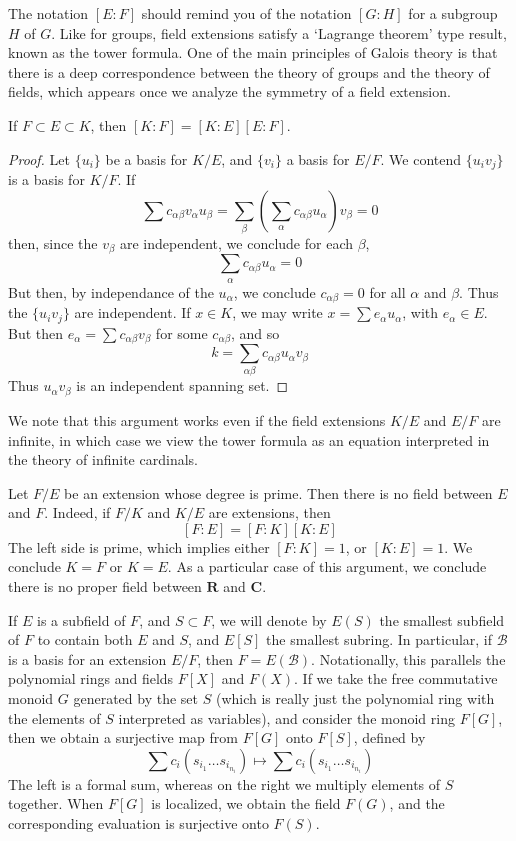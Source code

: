 The notation $[E:F]$ should remind you of the notation $[G:H]$ for a subgroup $H$ of $G$. Like for groups, field extensions satisfy a `Lagrange theorem' type result, known as the tower formula. One of the main principles of Galois theory is that there is a deep correspondence between the theory of groups and the theory of fields, which appears once we analyze the symmetry of a field extension.

\begin{theorem}
    If $F \subset E \subset K$, then $[K:F] = [K:E][E:F]$.
\end{theorem}
\begin{proof}
    Let $\{ u_i \}$ be a basis for $K/E$, and $\{ v_i \}$ a basis for $E/F$. We contend $\{ u_i v_j \}$ is a basis for $K/F$. If
    \[ \sum c_{\alpha \beta} v_\alpha u_\beta = \sum_\beta \left( \sum_\alpha c_{\alpha \beta} u_\alpha \right) v_\beta = 0 \]
    then, since the $v_\beta$ are independent, we conclude for each $\beta$,
    \[ \sum_\alpha c_{\alpha \beta} u_\alpha = 0 \]
    But then, by independance of the $u_\alpha$, we conclude $c_{\alpha \beta} = 0$ for all $\alpha$ and $\beta$. Thus the $\{ u_i v_j \}$ are independent. If $x \in K$, we may write $x = \sum e_\alpha u_\alpha$, with $e_\alpha \in E$. But then $e_\alpha = \sum c_{\alpha \beta} v_\beta$ for some $c_{\alpha \beta}$, and so
    \[ k = \sum_{\alpha \beta} c_{\alpha \beta} u_\alpha v_\beta \]
    Thus $u_\alpha v_\beta$ is an independent spanning set.
\end{proof}

We note that this argument works even if the field extensions $K/E$ and $E/F$ are infinite, in which case we view the tower formula as an equation interpreted in the theory of infinite cardinals.

\begin{example}
    Let $F/E$ be an extension whose degree is prime. Then there is no field between $E$ and $F$. Indeed, if $F/K$ and $K/E$ are extensions, then
    \[ [F:E] = [F:K][K:E] \]
    The left side is prime, which implies either $[F:K] = 1$, or $[K:E] = 1$. We conclude $K = F$ or $K = E$. As a particular case of this argument, we conclude there is no proper field between $\mathbf{R}$ and $\mathbf{C}$.
\end{example}

If $E$ is a subfield of $F$, and $S \subset F$, we will denote by $E(S)$ the smallest subfield of $F$ to contain both $E$ and $S$, and $E[S]$ the smallest subring. In particular, if $\mathcal{B}$ is a basis for an extension $E/F$, then $F = E(\mathcal{B})$. Notationally, this parallels the polynomial rings and fields $F[X]$ and $F(X)$. If we take the free commutative monoid $G$ generated by the set $S$ (which is really just the polynomial ring with the elements of $S$ interpreted as variables), and consider the monoid ring $F[G]$, then we obtain a surjective map from $F[G]$ onto $F[S]$, defined by
%
\[ \sum c_i (s_{i_1} \dots s_{i_{n_i}}) \mapsto \sum c_i (s_{i_1} \dots s_{i_{n_i}}) \]
%
The left is a formal sum, whereas on the right we multiply elements of $S$ together. When $F[G]$ is localized, we obtain the field $F(G)$, and the corresponding evaluation is surjective onto $F(S)$.

